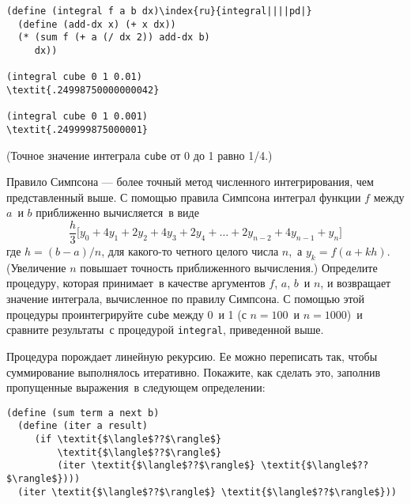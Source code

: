 \begin{Verbatim}[fontsize=\small]
(define (integral f a b dx)\index{ru}{integral||||pd|}
  (define (add-dx x) (+ x dx))
  (* (sum f (+ a (/ dx 2)) add-dx b)
     dx))

(integral cube 0 1 0.01)
\textit{.24998750000000042}

(integral cube 0 1 0.001)
\textit{.249999875000001}
\end{Verbatim}
(Точное значение интеграла {\tt cube} от 0 до 1 равно
1/4.)
\begin{exercise}{1.29}\label{EX1.29}%
%
%
Правило Симпсона --- более точный метод численного
интегрирования, чем представленный выше. С помощью правила Симпсона
интеграл функции $f$ между $a$~и $b$
приближенно вычисляется~в виде
$$
\dfrac{h}{3}\lbrack y_0 + 4y_1 + 2y_2 + 4y_3 + 2y_4 + \ldots + 2y_{n-2}
                + 4y_{n-1} + y_n\rbrack
$$
где $h = (b - a) / n$, для какого-то четного целого
числа $n$,~а $y_k = f(a + kh)$. (Увеличение
$n$ повышает точность приближенного вычисления.)
Определите процедуру, которая принимает~в качестве аргументов
$f$, $a$, $b$~и $n$, и
возвращает значение интеграла, вычисленное по
правилу Симпсона. С помощью этой процедуры проинтегрируйте
{\tt cube} между 0~и 1 (с $n = 100$~и $n =
1000$)~и сравните результаты~с процедурой {\tt integral}, 
приведенной выше.
\end{exercise}
\begin{exercise}{1.30}\label{EX1.30}%
Процедура  порождает линейную рекурсию.
Ее можно переписать так, чтобы суммирование выполнялось итеративно.
Покажите, как сделать это, заполнив пропущенные выражения~в следующем
определении: 

\begin{Verbatim}
(define (sum term a next b)
  (define (iter a result)
     (if \textit{$\langle$??$\rangle$}
         \textit{$\langle$??$\rangle$}
         (iter \textit{$\langle$??$\rangle$} \textit{$\langle$??$\rangle$})))
  (iter \textit{$\langle$??$\rangle$} \textit{$\langle$??$\rangle$}))
\end{Verbatim}

\end{exercise}
